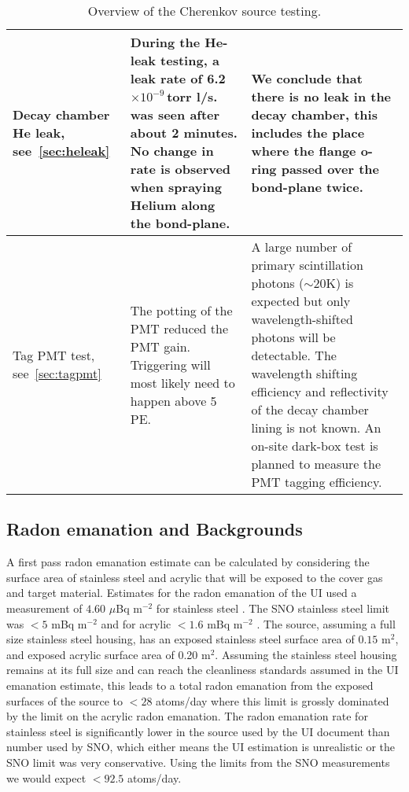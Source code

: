 \begin{table}[p]
\begin{tabular}{|p{2.7cm}|p{6cm}|p{7.3cm}|}
Decay chamber He leak, see~\ref{sec:heleak}
                        & During the He-leak testing, a leak rate of 6.2$\times10^{-9}$\,torr l/s. was seen after about 2 minutes. No change in rate is observed when spraying Helium along the bond-plane. & We conclude that there is no leak in the decay chamber, this includes the place where the flange o-ring passed over the bond-plane twice. \\ \hline

Tag PMT test, see~\ref{sec:tagpmt} 
                        & The potting of the PMT reduced the PMT gain. Triggering will most likely need to happen above 5\,PE. 
                        & A large number of primary scintillation photons ($\sim$20K) is expected but only wavelength-shifted photons will be detectable. The wavelength shifting efficiency and reflectivity of the decay chamber lining is not known. An on-site dark-box test is planned to measure the PMT tagging efficiency. \\ \hline
\end{tabular}
\caption{\label{tab:testoverview} Overview of the Cherenkov source testing.}
\end{table}

\subsection{Radon emanation and Backgrounds}
\label{sec:emanation}
A first pass radon emanation estimate can be calculated by considering the surface area of stainless steel and acrylic that will be exposed to the cover gas and target material. Estimates for the radon emanation of the UI used a measurement of $4.60$ $\mu$Bq m$^{-2}$ for stainless steel \cite{kormos:2015}. The SNO stainless steel limit was $< 5$ mBq m$^{-2}$ and for acrylic $< 1.6$ mBq m$^{-2}$ \cite{Liu:1993}. The source, assuming a full size stainless steel housing, has an exposed stainless steel surface area of $0.15$ m$^2$, and exposed acrylic surface area of 0.20 m$^2$. Assuming the stainless steel housing remains at its full size and can reach the cleanliness standards assumed in the UI emanation estimate, this leads to a total radon emanation from the exposed surfaces of the source to $<28$ atoms/day where this limit is grossly dominated by the limit on the acrylic radon emanation. The radon emanation rate for stainless steel is significantly lower in the source used by the UI document than number used by SNO, which either means the UI estimation is unrealistic or the SNO limit was very conservative. Using the limits from the SNO measurements we would expect $<92.5$ atoms/day.


